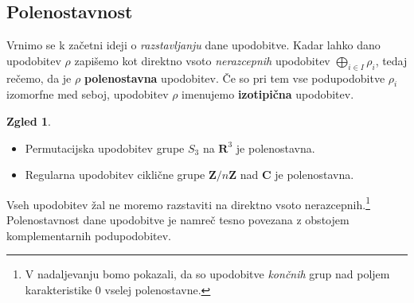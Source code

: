 \documentclass[11pt]{book}
\def\ZZ{\mathbf{Z}}
\def\RR{\mathbf{R}}
\def\CC{\mathbf{C}}
\def\definicija{\color{rdeca}\bf}
\theoremstyle{definition}
\theoremstyle{zgled}
\newtheorem{zgled}[theorem]{Zgled}
\theoremstyle{zgledbrezstevilke}
\theoremstyle{odprtproblem}
\theoremstyle{domacanaloga}
\theoremstyle{izrek}
\begin{document}
\subsection{Polenostavnost}

Vrnimo se k začetni ideji o \emph{razstavljanju} dane upodobitve. Kadar lahko dano upodobitev $\rho$ zapišemo kot direktno vsoto \emph{nerazcepnih} upodobitev $\bigoplus_{i \in I} \rho_i$, tedaj rečemo, da je $\rho$ {\definicija polenostavna} upodobitev. Če so pri tem vse podupodobitve $\rho_i$ izomorfne med seboj, upodobitev $\rho$ imenujemo {\definicija izotipična} upodobitev.

\begin{zgled} \leavevmode
    \begin{itemize}
        \item Permutacijska upodobitev grupe $S_3$ na $\RR^3$ je polenostavna.
        \item Regularna upodobitev ciklične grupe $\ZZ/n\ZZ$ nad $\CC$ je polenostavna.
    \end{itemize}
\end{zgled}

Vseh upodobitev žal ne moremo razstaviti na direktno vsoto nerazcepnih.\footnote{V nadaljevanju bomo pokazali, da so upodobitve \emph{končnih} grup nad poljem karakteristike $0$ vselej polenostavne.} Polenostavnost dane upodobitve je namreč tesno povezana z obstojem komplementarnih podupodobitev.
\end{document}
